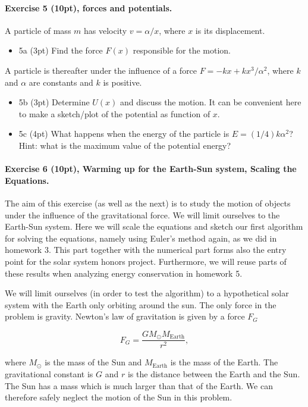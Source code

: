 \documentclass[%
oneside,                 %
final,                   %
10pt]{article}
\begin{document}
\noindent
\paragraph{Exercise 5 (10pt), forces  and potentials.}
A particle of mass $m$ has velocity $v=\alpha/x$, where $x$ is its displacement.

\begin{itemize}
\item 5a (3pt) Find the force $F(x)$ responsible for the motion.
\end{itemize}

\noindent
A particle is thereafter under the influence of a force $F=-kx+kx^3/\alpha^2$, where $k$ and $\alpha$ are constants and $k$ is positive.

\begin{itemize}
\item 5b (3pt) Determine $U(x)$  and discuss the motion. It can be convenient here to make a sketch/plot of the potential as function of $x$.

\item 5c (4pt)  What happens when the energy of the particle is $E=(1/4)k\alpha^2$? Hint: what is the maximum value of the potential energy?
\end{itemize}

\noindent
\paragraph{Exercise 6 (10pt), Warming up for the Earth-Sun system, Scaling the Equations.}
The aim of this exercise (as well as the next) is to study the motion
of objects under the influence of the gravitational force.  We will
limit ourselves to the Earth-Sun system. Here we will scale the
equations and sketch our first algorithm for solving the equations,
namely using Euler's method again, as we did in homework 3.  This part
together with the numerical part forms also the entry point for the
solar system honors project. Furthermore, we will reuse parts of these
results when analyzing energy conservation in homework 5.

We will limit ourselves (in order to test the algorithm) to a
hypothetical solar system with the Earth only orbiting around the sun.
The only force in the problem is gravity. Newton's law of gravitation
is given by a force $F_G$

\[
F_G=\frac{GM_{\odot}M_{\mathrm{Earth}}}{r^2},
\]

where $M_{\odot}$ is the mass of the Sun and $M_{\mathrm{Earth}}$ is
the mass of the Earth. The gravitational constant is $G$ and $r$ is
the distance between the Earth and the Sun.  The Sun
has a mass which is much larger than that of the Earth. We can
therefore safely neglect the motion of the Sun in this problem.
\end{document}
